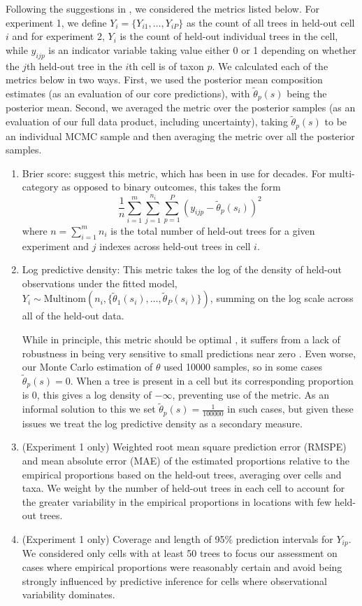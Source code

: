 \documentclass[12pt]{article}\usepackage[]{graphicx}\usepackage[]{color}
\begin{document}
Following the suggestions in \cite{Gnei:etal:2007}, we considered
the metrics listed below. For experiment 1, we define $Y_{i}=\{Y_{i1},\ldots,Y_{iP}\}$
as the count of all trees in held-out cell $i$ and for experiment
2, $Y_{i}$ is the count of held-out individual trees in the cell,
while $y_{ijp}$ is an indicator variable taking value either 0 or
1 depending on whether the $j$th held-out tree in the $i$th cell
is of taxon $p$. We calculated each of the metrics below in two ways.
First, we used the posterior mean composition estimates (as an evaluation
of our core predictions), with $\tilde{\theta}_{p}(s)$ being the
posterior mean. Second, we averaged the metric over the posterior
samples (as an evaluation of our full data product, including uncertainty),
taking $\tilde{\theta}_{p}(s)$ to be an individual MCMC sample and
then averaging the metric over all the posterior samples. 
\begin{enumerate}
\item Brier score: \cite{Gnei:etal:2007} suggest this metric, which has
been in use for decades. For multi-category as opposed to binary outcomes,
this takes the form
\[
\frac{1}{n}\sum_{i=1}^{m}\sum_{j=1}^{n_{i}}\sum_{p=1}^{P}(y_{ijp}-\tilde{\theta}_{p}(s_{i}))^{2}
\]
where $n=\sum_{i=1}^{m}n_{i}$ is the total number of held-out trees
for a given experiment and $j$ indexes across held-out trees in cell
$i$. 
\item Log predictive density: This metric takes the log of the density of
held-out observations under the fitted model, $Y_{i}\sim\mbox{Multinom}(n_{i},\{\tilde{\theta}_{1}(s_{i}),\ldots,\tilde{\theta}_{P}(s_{i})\})$,
summing on the log scale across all of the held-out data. 


While in principle, this metric should be optimal \citep{Krnj:Drap:2014},
it suffers from a lack of robustness in being very sensitive to small
predictions near zero \citep{Gnei:etal:2007}. Even worse, our Monte
Carlo estimation of $\theta$ used 10000 samples, so in some cases
$\tilde{\theta}_{p}(s)=0$. When a tree is present in a cell but its
corresponding proportion is 0, this gives a log density of $-\infty$,
preventing use of the metric. As an informal solution to this we set
$\tilde{\theta}_{p}(s)=\frac{1}{100000}$ in such cases, but given
these issues we treat the log predictive density as a secondary measure.

\item (Experiment 1 only) Weighted root mean square prediction error (RMSPE)
and mean absolute error (MAE) of the estimated proportions relative
to the empirical proportions based on the held-out trees, averaging
over cells and taxa. We weight by the number of held-out trees in
each cell to account for the greater variability in the empirical
proportions in locations with few held-out trees. 
\item (Experiment 1 only) Coverage and length of 95\% prediction intervals
for $Y_{ip}$. We considered only cells with at least 50 trees to
focus our assessment on cases where empirical proportions were reasonably
certain and avoid being strongly influenced by predictive inference
for cells where observational variability dominates.
\end{enumerate}
\end{document}
